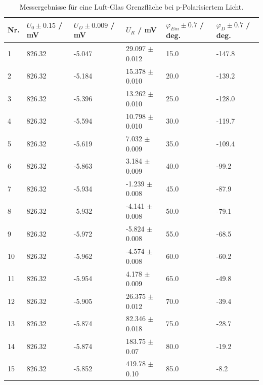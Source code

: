 \documentclass[12pt,a4paper,twoside]{article}
\begin{document}
\begin{table}[H]
    \centering
    \caption{Messergebnisse für eine Luft-Glas Grenzfläche bei p-Polarisiertem Licht. }
    \label{tab:mess luft glas p-pol}
    \begin{tabular}{| l | l | l | l | l | l |}
        \hline
        Nr. & $U_0 \pm 0.15 $ / mV & $U_D \pm 0.009$ / mV & $U_{R}$ / mV & $\varphi_{Ein} \pm 0.7$ / deg. & $\varphi_D \pm 0.7$ / deg.  \\
        \hline
        1  & 826.32 & -5.047 & 29.097 $\pm$ 0.012 & 15.0 & -147.8 \\
        2  & 826.32 & -5.184 & 15.378 $\pm$ 0.010 & 20.0 & -139.2 \\
        3  & 826.32 & -5.396 & 13.262 $\pm$ 0.010 & 25.0 & -128.0 \\
        4  & 826.32 & -5.594 & 10.798 $\pm$ 0.010 & 30.0 & -119.7 \\
        5  & 826.32 & -5.619 & 7.032  $\pm$ 0.009 & 35.0 & -109.4 \\
        6  & 826.32 & -5.863 & 3.184  $\pm$ 0.009 & 40.0 & -99.2  \\
        7  & 826.32 & -5.934 & -1.239 $\pm$ 0.008 & 45.0 & -87.9  \\
        8  & 826.32 & -5.932 & -4.141 $\pm$ 0.008 & 50.0 & -79.1  \\
        9  & 826.32 & -5.972 & -5.824 $\pm$ 0.008 & 55.0 & -68.5  \\
        10 & 826.32 & -5.962 & -4.574 $\pm$ 0.008 & 60.0 & -60.2  \\
        11 & 826.32 & -5.954 & 4.178  $\pm$ 0.009 & 65.0 & -49.8  \\
        12 & 826.32 & -5.905 & 26.375 $\pm$ 0.012 & 70.0 & -39.4  \\
        13 & 826.32 & -5.874 & 82.346 $\pm$ 0.018 & 75.0 & -28.7  \\
        14 & 826.32 & -5.874 & 183.75 $\pm$ 0.07  & 80.0 & -19.2  \\
        15 & 826.32 & -5.852 & 419.78 $\pm$ 0.10  & 85.0 & -8.2   \\
        \hline
    \end{tabular}
\end{table}
\end{document}
